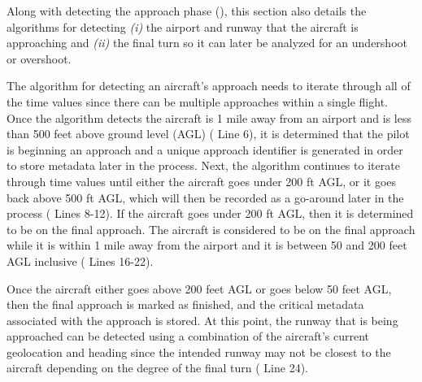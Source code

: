         Along with detecting the approach phase (), this section also details the algorithms for detecting \textit{(i)} the airport and runway that the aircraft is approaching and \textit{(ii)} the final turn so it can later be analyzed for an undershoot or overshoot.
        
        The algorithm for detecting an aircraft's approach needs to iterate through all of the time values since there can be multiple approaches within a single flight.  Once the algorithm detects the aircraft is 1 mile away from an airport and is less than 500 feet above ground level (AGL) ( Line 6), it is determined that the pilot is beginning an approach and a unique approach identifier is generated in order to store metadata later in the process.  Next, the algorithm continues to iterate through time values until either the aircraft goes under 200 ft AGL, or it goes back above 500 ft AGL, which will then be recorded as a go-around later in the process ( Lines 8-12).  If the aircraft goes under 200 ft AGL, then it is determined to be on the final approach.  The aircraft is considered to be on the final approach while it is within 1 mile away from the airport and it is between 50 and 200 feet AGL inclusive ( Lines 16-22).
    
    Once the aircraft either goes above 200 feet AGL or goes below 50 feet AGL, then the final approach is marked as finished, and the critical metadata associated with the approach is stored.  At this point, the runway that is being approached can be detected using a combination of the aircraft's current geolocation and heading since the intended runway may not be closest to the aircraft depending on the degree of the final turn ( Line 24).
        
